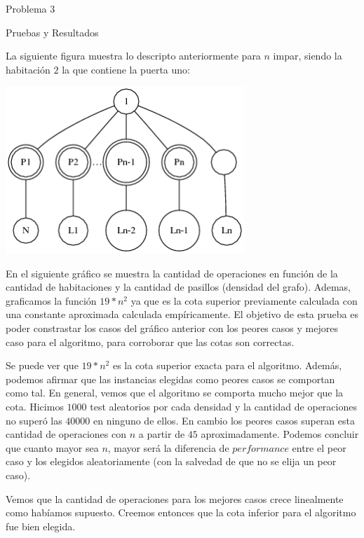 \begin{section}{Problema 3}
\begin{subsection}{Pruebas y Resultados}
		\VSP

		La siguiente figura muestra lo descripto anteriormente para $n$ impar, siendo la habitación $2$ la que contiene la puerta uno:\VSP

		\begin{center}\includegraphics[width=9cm]{prision/peor_caso_impar.png}\end{center}

		\newpage

		En el siguiente gráfico se muestra la cantidad de operaciones en función de la cantidad de habitaciones y la cantidad de pasillos (densidad del grafo). Ademas, graficamos la función $19*n^2$ ya que es la cota superior previamente calculada con una constante aproximada calculada empíricamente. El objetivo de esta prueba es poder constrastar los casos del gráfico anterior con los peores casos y mejores caso para el algoritmo, para corroborar que las cotas son correctas. 
		

		Se puede ver que $19*n^2$ es la cota superior exacta para el algoritmo. Además, podemos afirmar que las instancias elegidas como peores casos se comportan como tal. En general, vemos que el algoritmo se comporta mucho mejor que la cota. Hicimos $1000$ test aleatorios por cada densidad y la cantidad de operaciones no superó las $40000$ en ninguno de ellos. En cambio los peores casos superan esta cantidad de operaciones con $n$ a partir de $45$ aproximadamente. Podemos concluir que cuanto mayor sea $n$, mayor será la diferencia de $performance$ entre el peor caso y los elegidos aleatoriamente (con la salvedad de que no se elija un peor caso).

		Vemos que la cantidad de operaciones para los mejores casos crece linealmente como habíamos supuesto. Creemos entonces que la cota inferior para el algoritmo fue bien elegida.


\end{subsection}
\end{section}
